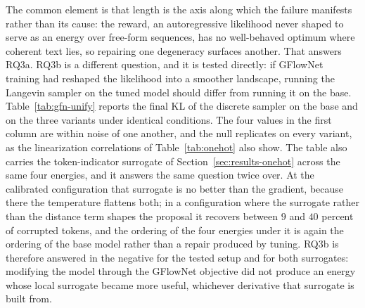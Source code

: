 The common element is that length is the axis along which the failure manifests rather than its cause: the reward, an autoregressive likelihood never shaped to serve as an energy over free-form sequences, has no well-behaved optimum where coherent text lies, so repairing one degeneracy surfaces another. That answers RQ3a. RQ3b is a different question, and it is tested directly: if GFlowNet training had reshaped the likelihood into a smoother landscape, running the Langevin sampler on the tuned model should differ from running it on the base. Table~\ref{tab:gfn-unify} reports the final KL of the discrete sampler on the base and on the three variants under identical conditions.
The four values in the first column are within noise of one another, and the null replicates on every variant, as the linearization correlations of Table~\ref{tab:onehot} also show. The table also carries the token-indicator surrogate of Section~\ref{sec:results-onehot} across the same four energies, and it answers the same question twice over. At the calibrated configuration that surrogate is no better than the gradient, because there the temperature flattens both; in a configuration where the surrogate rather than the distance term shapes the proposal it recovers between $9$ and $40$ percent of corrupted tokens, and the ordering of the four energies under it is again the ordering of the base model rather than a repair produced by tuning. RQ3b is therefore answered in the negative for the tested setup and for both surrogates: modifying the model through the GFlowNet objective did not produce an energy whose local surrogate became more useful, whichever derivative that surrogate is built from.

